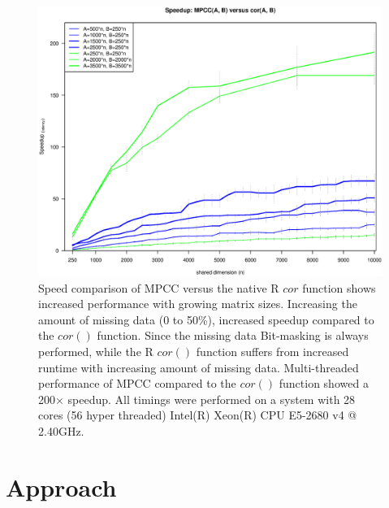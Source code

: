 \documentclass{bioinfo}
\begin{document}



\begin{figure}[H]
\centering
\includegraphics[width=\linewidth]{img/figure02new.eps}
  \caption{
  \small
    Speed comparison of MPCC versus the native R $cor$ function
    shows increased performance with growing matrix sizes. Increasing
    the amount of missing data (0 to 50\%), increased speedup compared 
    to the $cor()$ function. Since the missing data Bit-masking is always 
    performed, while the R $cor()$ function suffers from increased runtime 
    with increasing amount of missing data. Multi-threaded performance 
    of MPCC compared to the $cor()$ function showed a 200$\times$ speedup. 
    All timings were performed on a system with 28 cores (56 hyper threaded) Intel(R)
    Xeon(R) CPU E5-2680 v4 @ 2.40GHz.
}
  \label{fig:fig2}
\end{figure}

\vspace*{-5mm}

\section{Approach}
\end{document}
